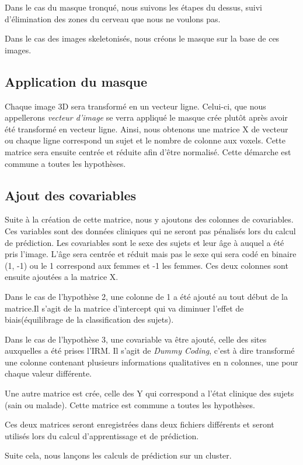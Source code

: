 Dans le cas du masque tronqué, nous suivons les étapes du dessus, suivi d'élimination des zones du cerveau que nous ne voulons pas.

Dans le cas des images skeletonisés, nous créons le masque sur la base de ces images. 


\subsection{Application du masque}

Chaque image 3D sera transformé en un vecteur ligne. Celui-ci, que nous appellerons \textit{vecteur d'image} se verra appliqué le masque crée plutôt après avoir été transformé en vecteur ligne. Ainsi, nous obtenons une matrice X de vecteur ou chaque ligne correspond un sujet et le nombre de colonne aux voxels.
Cette matrice sera ensuite centrée et réduite afin d'être normalisé. 
Cette démarche est commune a toutes les hypothèses. 

\subsection{Ajout des covariables}

Suite à la création de cette matrice, nous y ajoutons des colonnes de covariables. Ces variables sont des données cliniques qui ne seront pas pénalisés lors du calcul de prédiction. Les covariables sont le sexe des sujets et leur âge à auquel a été pris l'image. 
L'âge sera centrée et réduit mais pas le sexe qui sera codé en binaire (1, -1) ou le 1 correspond aux femmes et -1 les femmes. 
Ces deux colonnes sont ensuite ajoutées a la matrice X. 

Dans le cas de l'hypothèse 2, une colonne de 1 a été ajouté au tout début de la matrice.Il s'agit de la matrice d'intercept qui va diminuer l'effet de biais(équilibrage de la classification des sujets).

Dans le cas de l'hypothèse 3, une covariable va être ajouté, celle des sites auxquelles a été prises l'IRM. Il s'agit de \textit{Dummy Coding}, c'est à dire transformé une colonne contenant plusieurs informations qualitatives en n colonnes, une pour chaque valeur différente. 

Une autre matrice est crée, celle des Y qui correspond a l'état clinique des sujets (sain ou malade). Cette matrice est commune a toutes les hypothèses. 

Ces deux matrices seront enregistrées dans deux fichiers différents et seront utilisés lors du calcul d'apprentissage et de prédiction.


Suite cela, nous lançons les calculs de prédiction sur un cluster. 


